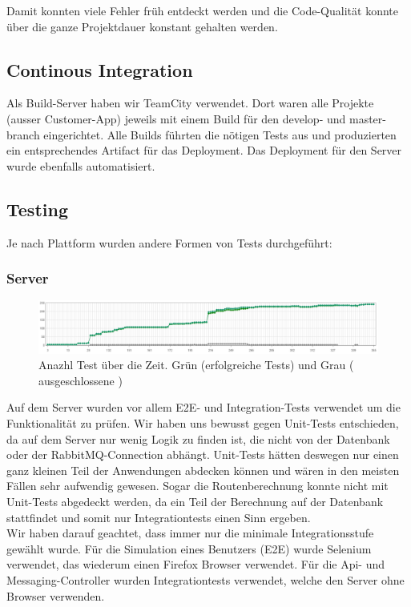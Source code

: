 Damit konnten viele Fehler früh entdeckt werden und die Code-Qualität konnte über die ganze Projektdauer konstant gehalten werden.

\subsection{Continous Integration}

Als Build-Server haben wir TeamCity verwendet. Dort waren alle Projekte (ausser Customer-App) jeweils mit einem Build für den develop- und master-branch eingerichtet. Alle Builds führten die nötigen Tests aus und produzierten ein entsprechendes Artifact für das Deployment. Das Deployment für den Server wurde ebenfalls automatisiert.

\subsection{Testing}

Je nach Plattform wurden andere Formen von Tests durchgeführt:

\subsubsection{Server}
\begin{figure}[h]
	\centering
	\includegraphics[width=1\textwidth] {images/test-count-chart.png}
	\caption{Anazhl Test über die Zeit. Grün (erfolgreiche Tests) und Grau ( ausgeschlossene )}
\end{figure}

Auf dem Server wurden vor allem E2E- und Integration-Tests verwendet um die Funktionalität zu prüfen. Wir haben uns bewusst gegen Unit-Tests entschieden, da auf dem Server nur wenig Logik zu finden ist, die nicht von der Datenbank oder der RabbitMQ-Connection abhängt. Unit-Tests hätten deswegen nur einen ganz kleinen Teil der Anwendungen abdecken können und wären in den meisten Fällen sehr aufwendig gewesen. Sogar die Routenberechnung konnte nicht mit Unit-Tests abgedeckt werden, da ein Teil der Berechnung auf der Datenbank stattfindet und somit nur Integrationtests einen Sinn ergeben.\\

Wir haben darauf geachtet, dass immer nur die minimale Integrationsstufe gewählt wurde. Für die Simulation eines Benutzers (E2E) wurde Selenium verwendet, das wiederum einen Firefox Browser verwendet. Für die Api- und Messaging-Controller wurden Integrationtests verwendet, welche den Server ohne Browser verwenden.\\

